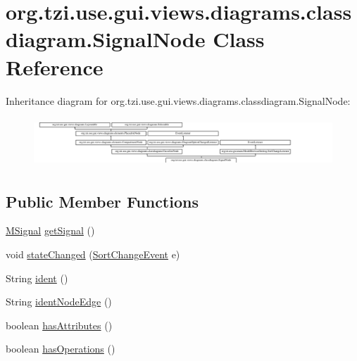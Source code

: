 \hypertarget{classorg_1_1tzi_1_1use_1_1gui_1_1views_1_1diagrams_1_1classdiagram_1_1_signal_node}{\section{org.\-tzi.\-use.\-gui.\-views.\-diagrams.\-classdiagram.\-Signal\-Node Class Reference}
\label{classorg_1_1tzi_1_1use_1_1gui_1_1views_1_1diagrams_1_1classdiagram_1_1_signal_node}
}
Inheritance diagram for org.\-tzi.\-use.\-gui.\-views.\-diagrams.\-classdiagram.\-Signal\-Node\-:\begin{figure}[H]
\begin{center}
\leavevmode
\includegraphics[height=1.866667cm]{classorg_1_1tzi_1_1use_1_1gui_1_1views_1_1diagrams_1_1classdiagram_1_1_signal_node}
\end{center}
\end{figure}
\subsection*{Public Member Functions}
\begin{DoxyCompactItemize}
\item 
\hyperlink{interfaceorg_1_1tzi_1_1use_1_1uml_1_1mm_1_1commonbehavior_1_1communications_1_1_m_signal}{M\-Signal} \hyperlink{classorg_1_1tzi_1_1use_1_1gui_1_1views_1_1diagrams_1_1classdiagram_1_1_signal_node_a6eca338a5a807c3a0e6ac6e65c194def}{get\-Signal} ()
\item 
void \hyperlink{classorg_1_1tzi_1_1use_1_1gui_1_1views_1_1diagrams_1_1classdiagram_1_1_signal_node_a19def5374710e2f952e81099d9558747}{state\-Changed} (\hyperlink{classorg_1_1tzi_1_1use_1_1gui_1_1main_1_1_model_browser_sorting_1_1_sort_change_event}{Sort\-Change\-Event} e)
\item 
String \hyperlink{classorg_1_1tzi_1_1use_1_1gui_1_1views_1_1diagrams_1_1classdiagram_1_1_signal_node_a604d02cbc3e5bff62ac8d7097eb2ff8b}{ident} ()
\item 
String \hyperlink{classorg_1_1tzi_1_1use_1_1gui_1_1views_1_1diagrams_1_1classdiagram_1_1_signal_node_a7553784b8466099cf96adc4a5f3a26c5}{ident\-Node\-Edge} ()
\item 
boolean \hyperlink{classorg_1_1tzi_1_1use_1_1gui_1_1views_1_1diagrams_1_1classdiagram_1_1_signal_node_ad7fa6177305a4ee67e7c50f9915cb789}{has\-Attributes} ()
\item 
boolean \hyperlink{classorg_1_1tzi_1_1use_1_1gui_1_1views_1_1diagrams_1_1classdiagram_1_1_signal_node_a0b8207956d98a818d8ce5b0d5621cfe4}{has\-Operations} ()
\end{DoxyCompactItemize}

